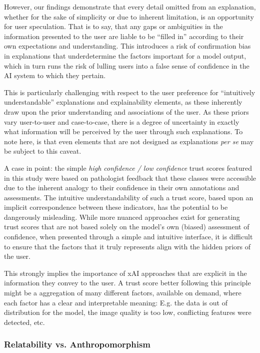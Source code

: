 \documentclass[final,5p,times,twocolumn,hyphens]{elsarticle}
\begin{document}
However, our findings demonstrate that every detail omitted from an explanation, whether for the sake of simplicity or due to inherent limitation, is an opportunity for user speculation. That is to say, that any gaps or ambiguities in the information presented to the user are liable to be ``filled in'' according to their own expectations and understanding. This introduces a risk of confirmation bias in explanations that underdetermine the factors important for a model output, which in turn runs the risk of lulling users into a false sense of confidence in the AI system to which they pertain.

This is particularly challenging with respect to the user preference for ``intuitively understandable'' explanations and explainability elements, as these inherently draw upon the prior understanding and associations of the user. As these priors vary user-to-user and case-to-case, there is a degree of uncertainty in exactly what information will be perceived by the user through such explanations. To note here, is that even elements that are not designed as explanations \textit{per se} may be subject to this caveat.

A case in point: the simple \textit{high confidence / low confidence} trust scores featured in this study were based on pathologist feedback that these classes were accessible due to the inherent analogy to their confidence in their own annotations and assessments. The intuitive understandability of such a trust score, based upon an implicit correspondence between these indicators, has the potential to be dangerously misleading. While more nuanced approaches exist for generating trust scores that are not based solely on the model's own (biased) assessment of confidence, when presented through a simple and intuitive interface, it is difficult to ensure that the factors that it truly represents align with the hidden priors of the user.

This strongly implies the importance of xAI approaches that are explicit in the information they convey to the user. A trust score better following this principle might be a aggregation of many different factors, available on demand, where each factor has a clear and interpretable meaning: E.g. the data is out of distribution for the model, the image quality is too low, conflicting features were detected, etc.

\subsubsection{Relatability vs. Anthropomorphism}
\end{document}
